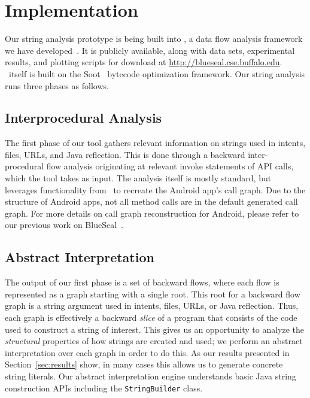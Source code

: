 \section{Implementation}
\label{sec:impl}

Our string analysis prototype is being built into \bs, a data flow analysis
framework we have developed~\cite{Blueseal}. It is publicly available, along
with data sets, experimental results, and plotting scripts for download at
\url{http://blueseal.cse.buffalo.edu}. \bs~itself is built on the
Soot~\cite{Vallee-Rai:1999:SJB} bytecode optimization framework. Our string
analysis runs three phases as follows.

\subsection{Interprocedural Analysis}

The first phase of our tool gathers relevant information on strings used in
intents, files, URLs, and Java reflection. This is done through a backward
inter-procedural flow analysis originating at relevant invoke statements of API
calls, which the tool takes as input. The analysis itself is mostly standard,
but leverages functionality from \bs~to recreate the Android app's call
graph. Due to the structure of Android apps, not all method calls are in
the default generated call graph. For more details on call graph reconstruction
for Android, please refer to our previous work on BlueSeal~\cite{Blueseal}. 

\subsection{Abstract Interpretation}

The output of our first phase is a set of backward flows, where each flow is
represented as a graph starting with a single root. This root for a backward
flow graph is a string argument used in intents, files, URLs, or Java
reflection. Thus, each graph is effectively a backward {\em slice} of a program
that consists of the code used to construct a string of interest. This gives us
an opportunity to analyze the {\em structural} properties of how strings are
created and used; we perform an abstract interpretation over each graph in order
to do this. As our results presented in Section~\ref{sec:results} show, in many
cases this allows us to generate concrete string literals. Our abstract
interpretation engine understands basic Java string construction APIs including
the \texttt{StringBuilder} class.  

